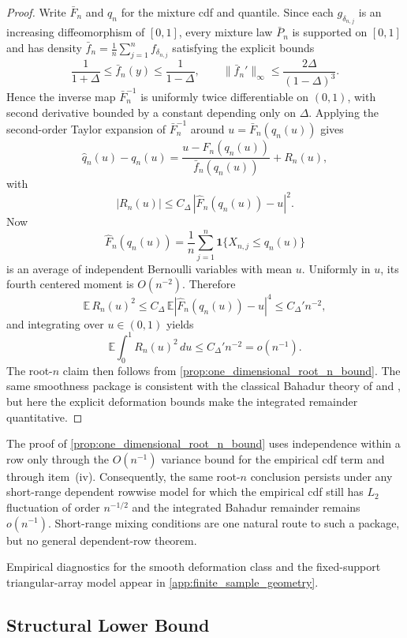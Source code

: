 \begin{proof}
Write $\bar F_n$ and $q_n$ for the mixture cdf and quantile. Since each
$g_{\delta_{n,j}}$ is an increasing diffeomorphism of $[0,1]$, every mixture law
$\bar P_n$ is supported on $[0,1]$ and has density
$\bar f_n=\frac1n\sum_{j=1}^n f_{\delta_{n,j}}$ satisfying the explicit bounds
\[
  \frac{1}{1+\Delta}\le \bar f_n(y)\le \frac{1}{1-\Delta},
  \qquad
  \|\bar f_n'\|_\infty\le \frac{2\Delta}{(1-\Delta)^3}.
\]
Hence the inverse map $\bar F_n^{-1}$ is uniformly twice differentiable on
$(0,1)$, with second derivative bounded by a constant depending only on
$\Delta$. Applying the second-order Taylor expansion of $\bar F_n^{-1}$ around
$u=\bar F_n(q_n(u))$ gives
\[
  \widehat q_n(u)-q_n(u)
  = \frac{u-\widehat F_n(q_n(u))}{\bar f_n(q_n(u))} + R_n(u),
\]
with
\[
  |R_n(u)|\le C_\Delta\,|\widehat F_n(q_n(u))-u|^2.
\]
Now
\[
  \widehat F_n(q_n(u))
  =\frac1n\sum_{j=1}^n \mathbf 1\{X_{n,j}\le q_n(u)\}
\]
is an average of independent Bernoulli variables with mean $u$. Uniformly in
$u$, its fourth centered moment is $O(n^{-2})$. Therefore
\[
  \mathbb E\,R_n(u)^2\le C_\Delta\,\mathbb E|\widehat F_n(q_n(u))-u|^4
  \le C_\Delta' n^{-2},
\]
and integrating over $u\in(0,1)$ yields
\[
  \mathbb E\int_0^1 R_n(u)^2\,du\le C_\Delta' n^{-2}=o(n^{-1}).
\]
The root-$n$ claim then follows from \cref{prop:one_dimensional_root_n_bound}.
The same smoothness package is consistent with the classical Bahadur theory of
\citet{Bahadur1966} and \citet[Chapter~21]{vanDerVaart1998}, but here the
explicit deformation bounds make the integrated remainder quantitative.
\end{proof}

\begin{remark}
The proof of \cref{prop:one_dimensional_root_n_bound} uses independence within a
row only through the $O(n^{-1})$ variance bound for the empirical cdf term and
through item~(iv). Consequently, the same root-$n$ conclusion persists under any
short-range dependent rowwise model for which the empirical cdf still has
$L_2$ fluctuation of order $n^{-1/2}$ and the integrated Bahadur remainder
remains $o(n^{-1})$. Short-range mixing conditions are one natural route to such
a package, but no general dependent-row
theorem.
\end{remark}

Empirical diagnostics for the smooth deformation class and the fixed-support
triangular-array model appear in \cref{app:finite_sample_geometry}.

\subsection{Structural Lower Bound}\label{subsec:lower_bound}

